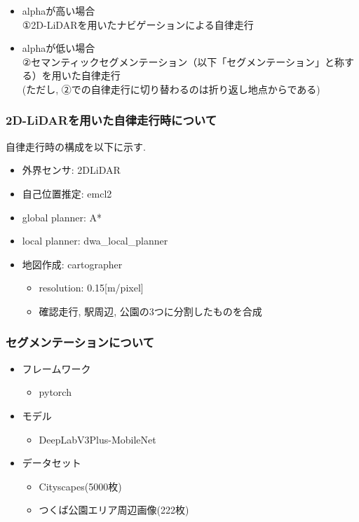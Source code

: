 \documentclass[uplatex, twocolumn, 9pt]{jsproceedings}
\begin{document}
\newpage

\begin{itemize}
  \item alphaが高い場合\\
  ①2D-LiDARを用いたナビゲーションによる自律走行
  \item alphaが低い場合\\
  ②セマンティックセグメンテーション\cite{Deeplab}（以下「セグメンテーション」と称する）を用いた自律走行\\
  (ただし, ②での自律走行に切り替わるのは折り返し地点からである)
\end{itemize}

\subsubsection{2D-LiDARを用いた自律走行時について}
自律走行時の構成を以下に示す.
\begin{itemize}
  \item 外界センサ: 2DLiDAR
  \item 自己位置推定: emcl2
  \item global planner: A*
  \item local planner: dwa\_local\_planner
  \item 地図作成: cartographer
  \begin{itemize}
    \item resolution: 0.15[m/pixel]
    \item 確認走行, 駅周辺, 公園の3つに分割したものを合成
  \end{itemize}
\end{itemize}

\subsubsection{セグメンテーションについて}
\begin{itemize}
  \item フレームワーク
  \begin{itemize}
    \item pytorch
  \end{itemize}
\end{itemize}
\begin{itemize}
  \item モデル
  \begin{itemize}
    \item DeepLabV3Plus-MobileNet
  \end{itemize}
\end{itemize}
\begin{itemize}
  \item データセット
  \begin{itemize}
    \item Cityscapes(5000枚)
    \item つくば公園エリア周辺画像(222枚)
  \end{itemize}
\end{itemize}
\end{document}

